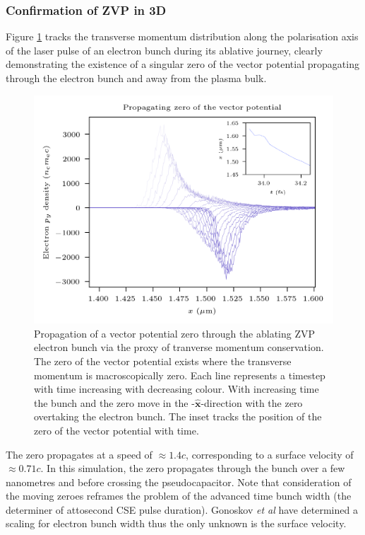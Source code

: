 \subsubsection{Confirmation of ZVP in 3D}
Figure \ref{fig:zvppropagatingzero} tracks the transverse momentum distribution along the polarisation axis of the laser pulse of an electron bunch during its ablative journey, clearly demonstrating the existence of a singular zero of the vector potential propagating through the electron bunch and away from the plasma bulk.
\begin{figure}
	\centering
	\includegraphics[width=0.7\linewidth]{figures/zvp/zvp_propagating_zero}
	\caption[Propagation of a vector potential zero through the ablating ZVP electron bunch.]{Propagation of a vector potential zero through the ablating ZVP electron bunch via the proxy of tranverse momentum conservation. The zero of the vector potential exists where the transverse momentum is macroscopically zero. Each line represents a timestep with time increasing with decreasing colour. With increasing time the bunch and the zero move in the -$\hat{\mathbf{x}}$-direction with the zero overtaking the electron bunch. The inset tracks the position of the zero of the vector potential with time.}
	\label{fig:zvppropagatingzero}
\end{figure}
The zero propagates at a speed of $\approx 1.4c$, corresponding to a surface velocity of $\approx 0.71c$. In this simulation, the zero propagates through the bunch over a few nanometres and before crossing the pseudocapacitor. Note that consideration of the moving zeroes reframes the problem of the advanced time bunch width \cite{edwardsXRayEmissionEffectiveness2020} (the determiner of attosecond CSE pulse duration). Gonoskov \textit{et al} have determined a scaling for electron bunch width \cite{gonoskovUltrarelativisticNanoplasmonicsRoute2011} thus the only unknown is the surface velocity.

